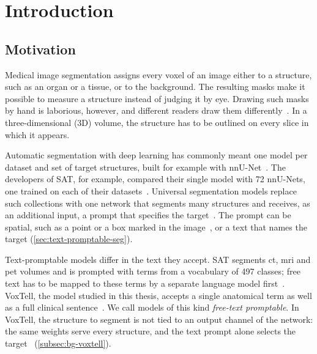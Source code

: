 %

\chapter{Introduction}
\label{chap:intro}

\section{Motivation}
\label{sec:intro-motivation}

Medical image segmentation assigns every voxel of an image either to a structure, such as an organ or a tissue, or to the background.
The resulting masks make it possible to measure a structure instead of judging it by eye.
Drawing such masks by hand is laborious, however, and different readers draw them differently~\cite{desai2021skmtea}.
In a three-dimensional (3D) volume, the structure has to be outlined on every slice in which it appears.

Automatic segmentation with deep learning has commonly meant one model per dataset and set of target structures, built for example with nnU-Net~\cite{isensee2018nnunetselfadaptingframeworkunetbased}.
The developers of SAT, for example, compared their single model with 72 nnU-Nets, one trained on each of their datasets~\cite{zhao2025sat}.
Universal segmentation models replace such collections with one network that segments many structures and receives, as an additional input, a prompt that specifies the target~\cite{zhao2025sat,rokuss2025voxtellfreetextpromptableuniversal}.
The prompt can be spatial, such as a point or a box marked in the image~\cite{Ma_2024,cheng2023sammed2d}, or a text that names the target (\cref{sec:text-promptable-seg}).

Text-promptable models differ in the text they accept.
SAT segments \gls{ct}, \gls{mri} and \gls{pet} volumes and is prompted with terms from a vocabulary of 497 classes; free text has to be mapped to these terms by a separate language model first~\cite{zhao2025sat}.
VoxTell, the model studied in this thesis, accepts a single anatomical term as well as a full clinical sentence~\cite{rokuss2025voxtellfreetextpromptableuniversal}.
We call models of this kind \emph{free-text promptable}.
In VoxTell, the structure to segment is not tied to an output channel of the network: the same weights serve every structure, and the text prompt alone selects the target~\cite[Sec.~3]{rokuss2025voxtellfreetextpromptableuniversal} (\cref{subsec:bg-voxtell}).

